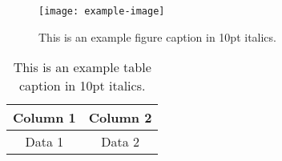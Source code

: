 \documentclass[conference, 11pt, a4paper]{IEEEtran}
\begin{document}
\newpage

\begin{figure}[h]
    \centering
    \texttt{[image: example-image]}
    \caption{This is an example figure caption in 10pt italics.}
    \label{fig:example}
\end{figure}

\begin{table}[h]
    \centering
    \caption{This is an example table caption in 10pt italics.}
    \begin{tabular}{|c|c|}
        \hline
        Column 1 & Column 2 \\
        \hline
        Data 1   & Data 2   \\
        \hline
    \end{tabular}
    \label{tab:example}
\end{table}





\end{document}
